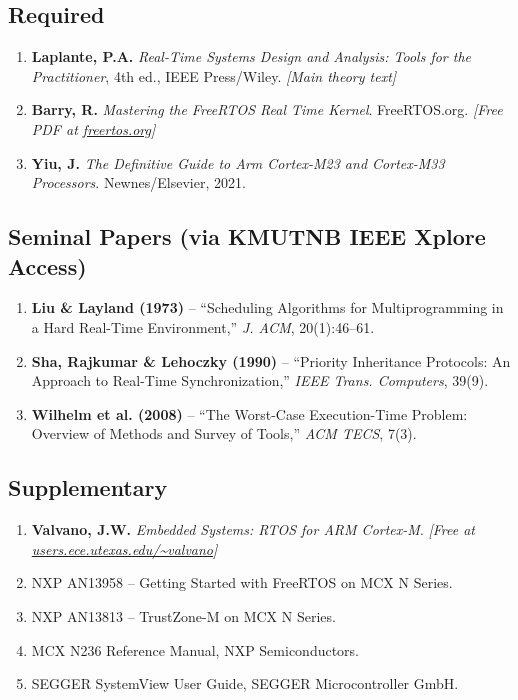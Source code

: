 \documentclass[12pt, a4paper]{article}
\begin{document}
\subsection{Required}
\begin{enumerate}[noitemsep]
  \item \textbf{Laplante, P.A.} \textit{Real-Time Systems Design and Analysis:
        Tools for the Practitioner}, 4th ed., IEEE Press/Wiley. \hfill\textit{[Main theory text]}
  \item \textbf{Barry, R.} \textit{Mastering the FreeRTOS Real Time Kernel}.
        FreeRTOS.org. \textit{[Free PDF at \href{https://www.freertos.org}{freertos.org}]}
  \item \textbf{Yiu, J.} \textit{The Definitive Guide to Arm Cortex-M23 and
        Cortex-M33 Processors}. Newnes/Elsevier, 2021.
\end{enumerate}

\subsection{Seminal Papers (via KMUTNB IEEE Xplore Access)}
\begin{enumerate}[noitemsep]
  \item \textbf{Liu \& Layland (1973)} -- ``Scheduling Algorithms for Multiprogramming
        in a Hard Real-Time Environment,'' \textit{J. ACM}, 20(1):46--61.
  \item \textbf{Sha, Rajkumar \& Lehoczky (1990)} -- ``Priority Inheritance Protocols:
        An Approach to Real-Time Synchronization,'' \textit{IEEE Trans. Computers}, 39(9).
  \item \textbf{Wilhelm et al. (2008)} -- ``The Worst-Case Execution-Time Problem:
        Overview of Methods and Survey of Tools,'' \textit{ACM TECS}, 7(3).
\end{enumerate}

\subsection{Supplementary}
\begin{enumerate}[noitemsep]
  \item \textbf{Valvano, J.W.} \textit{Embedded Systems: RTOS for ARM Cortex-M}.
        \textit{[Free at \href{http://users.ece.utexas.edu/~valvano}{users.ece.utexas.edu/\textasciitilde valvano}]}
  \item NXP AN13958 -- Getting Started with FreeRTOS on MCX N Series.
  \item NXP AN13813 -- TrustZone-M on MCX N Series.
  \item MCX N236 Reference Manual, NXP Semiconductors.
  \item SEGGER SystemView User Guide, SEGGER Microcontroller GmbH.
\end{enumerate}
\end{document}
